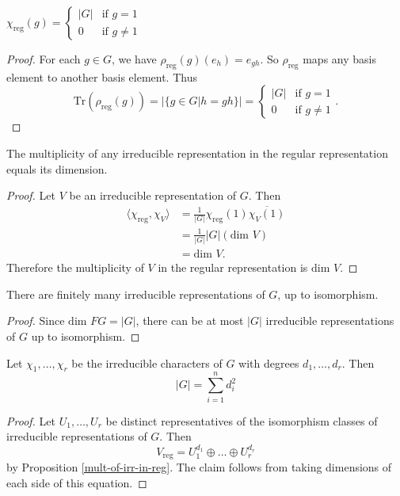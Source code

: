 \begin{lemma}
$\chi_{\text{reg}}(g) = \begin{cases} |G| &\text{if } g=1 \\ 0 &\text{if } g \neq 1 \end{cases}$
\end{lemma}
\begin{proof}
For each $g \in G$, we have $\rho_{\text{reg}} (g) (e_h) = e_{gh}$.  So $\rho_{\text{reg}}$ maps any basis element to another basis element.  
Thus \[ \text{Tr} (\rho_{\text{reg}} (g)) = | \{ g \in G | h=gh \} | = \begin{cases} |G| &\text{if } g=1 \\ 0 &\text{if } g \neq 1 \end{cases}. \]
\end{proof}

\begin{prop} \label{mult-of-irr-in-reg}
The multiplicity of any irreducible representation in the regular representation equals its dimension.
\end{prop}
\begin{proof}
Let $V$ be an irreducible representation of $G$.  Then
\begin{align*}
\langle \chi_{\text{reg}}, \chi_V \rangle &= \frac{1}{|G|} \chi_{\text{reg}}(1) \overline{\chi_V (1)} \\
&= \frac{1}{|G|} |G| (\text{dim } V) \\
&= \text{dim } V.
\end{align*}
Therefore the multiplicity of $V$ in the regular representation is $\text{dim } V$.
\end{proof}

\begin{cor}
There are finitely many irreducible representations of $G$, up to isomorphism.
\end{cor}
\begin{proof}
Since $\text{dim } FG = |G|$, there can be at most $|G|$ irreducible representations of $G$ up to isomorphism.
\end{proof}


\begin{cor}
Let $\chi_1, \ldots, \chi_r$ be the irreducible characters of $G$ with degrees $d_1, \ldots, d_r$.  Then
\[ |G| = \sum_{i=1}^n d_i^2 \]
\end{cor}
\begin{proof}
Let $U_1, \ldots, U_r$ be distinct representatives of the isomorphism classes of irreducible representations of $G$.  Then
\[ V_{\text{reg}} = U_1 ^ {d_1} \oplus \ldots \oplus U_r ^{d_r} \]
by Proposition \ref{mult-of-irr-in-reg}.  The claim follows from taking dimensions of each side of this equation.
\end{proof}

